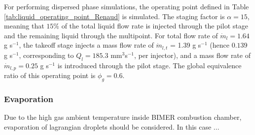 For performing dispersed phase simulations, the operating point defined in Table \ref{tab:liquid_operating_point_Renaud} is simulated. The staging factor is $\alpha = 15$, meaning that $15 \%$ of the total liquid flow rate is injected through the pilot stage and the remaining liquid through the multipoint. For total flow rate of $\dot{m}_l = 1.64$ g s$^{-1}$, the takeoff stage injects a mass flow rate of $\dot{m}_{l,t}$ = 1.39 g s$^{-1}$ (hence $0.139$ g s$^{-1}$, corresponding to $Q_l = 185.3$ mm$^3$s$^{-1}$,  per injector), and a mass flow rate of $\dot{m}_{l,p} = 0.25$ g s$^{-1}$ is introduced through the pilot stage. The global equivalence ratio of this operating point is $\phi_g = 0.6$.

\subsubsection*{Evaporation}

Due to the high gas ambient temperature inside BIMER combustion chamber, evaporation of lagrangian droplets should be considered. In this case ...


